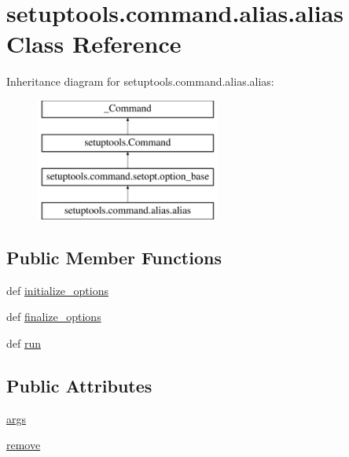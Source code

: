 \hypertarget{classsetuptools_1_1command_1_1alias_1_1alias}{}\section{setuptools.\+command.\+alias.\+alias Class Reference}
\label{classsetuptools_1_1command_1_1alias_1_1alias}
Inheritance diagram for setuptools.\+command.\+alias.\+alias\+:\begin{figure}[H]
\begin{center}
\leavevmode
\includegraphics[height=4.000000cm]{classsetuptools_1_1command_1_1alias_1_1alias}
\end{center}
\end{figure}
\subsection*{Public Member Functions}
\begin{DoxyCompactItemize}
\item 
def \hyperlink{classsetuptools_1_1command_1_1alias_1_1alias_a4b5df558c2e5cd2cfb2c79463c3e3711}{initialize\+\_\+options}
\item 
def \hyperlink{classsetuptools_1_1command_1_1alias_1_1alias_a037024a980a77dc3c8bd36b48ac69878}{finalize\+\_\+options}
\item 
def \hyperlink{classsetuptools_1_1command_1_1alias_1_1alias_af10f1ebc4bf4773121afa122d0b2e458}{run}
\end{DoxyCompactItemize}
\subsection*{Public Attributes}
\begin{DoxyCompactItemize}
\item 
\hyperlink{classsetuptools_1_1command_1_1alias_1_1alias_a4351af0dab2928c3e5811425cd26ff45}{args}
\item 
\hyperlink{classsetuptools_1_1command_1_1alias_1_1alias_a3de85705b6935c662ccecee8cc2b59d9}{remove}
\end{DoxyCompactItemize}
